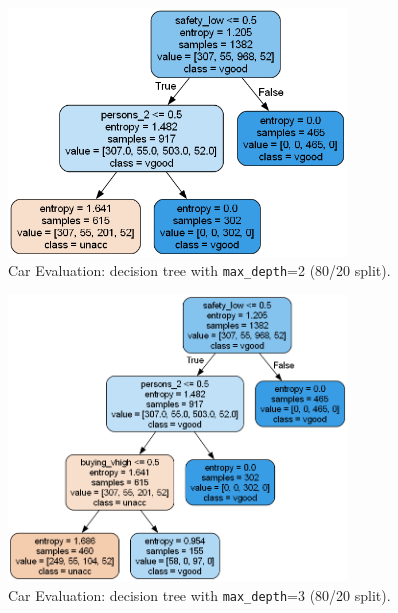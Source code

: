 \begin{figure}[H]
	\centering
	\includegraphics[width=0.8\textwidth]{imgs/dt/dt__car_evaluation__80_vs_20__2.png}
	\caption{Car Evaluation: decision tree with \texttt{max\_depth}=2 (80/20 split).}
	\label{fig:ce-dt-depth-2}
\end{figure}

\begin{figure}[H]
	\centering
	\includegraphics[width=0.8\textwidth]{imgs/dt/dt__car_evaluation__80_vs_20__3.png}
	\caption{Car Evaluation: decision tree with \texttt{max\_depth}=3 (80/20 split).}
	\label{fig:ce-dt-depth-3}
\end{figure}

